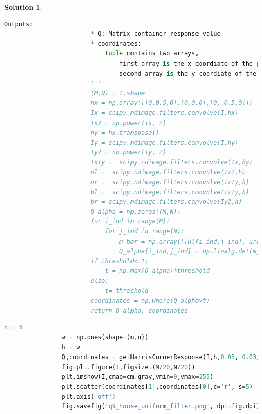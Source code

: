 \documentclass[11pt]{article}
\theoremstyle{plain}
\theoremstyle{definition}
\newtheorem{solution}{Solution}
\theoremstyle{remark}
\begin{document}
\begin{solution}
\begin{enumerate}
\begin{lstlisting}[language=Python, caption=Implementation of function $Q_a$]
					    Outputs:
					    * Q: Matrix container response value
					    * coordinates: 
					        tuple contains two arrays, 
					            first array is the x coordiate of the potins has corner response value larger than threshold
					            second array is the y coordiate of the potins has corner response value larger than threshold
					    '''
					    (M,N) = I.shape
					    hx = np.array([[0,0.5,0],[0,0,0],[0,-0.5,0]])
					    Ix = scipy.ndimage.filters.convolve(I,hx)
					    Ix2 = np.power(Ix, 2)
					    hy = hx.transpose()
					    Iy = scipy.ndimage.filters.convolve(I,hy)
					    Iy2 = np.power(Iy, 2)
					    IxIy =  scipy.ndimage.filters.convolve(Ix,hy)
					    ul =  scipy.ndimage.filters.convolve(Ix2,h)
					    ur =  scipy.ndimage.filters.convolve(IxIy,h)
					    bl =  scipy.ndimage.filters.convolve(IxIy,h)
					    br = scipy.ndimage.filters.convolve(Iy2,h)
					    Q_alpha = np.zeros((M,N))
					    for i_ind in range(M):
					        for j_ind in range(N):
					            m_bar = np.array([[ul[i_ind,j_ind], ur[i_ind,j_ind]],[bl[i_ind,j_ind],br[i_ind,j_ind]]])
					            Q_alpha[i_ind,j_ind] = np.linalg.det(m_bar) - alpha*(np.trace(m_bar))**2
					    if threshold<=1:
					        t = np.max(Q_alpha)*threshold
					    else:
					        t= threshold
					    coordinates = np.where(Q_alpha>t)
					    return Q_alpha, coordinates
			\end{lstlisting}
			
			\begin{lstlisting}[language=Python, caption=house with uniform filter]
				n = 3
				w = np.ones(shape=(n,n))
				h = w
				Q,coordinates = getHarrisCornerResponse(I,h,0.05, 0.03)
				fig=plt.figure(1,figsize=(M/20,N/20))
				plt.imshow(I,cmap=cm.gray,vmin=0,vmax=255)
				plt.scatter(coordinates[1],coordinates[0],c='r', s=5)
				plt.axis('off')
				fig.savefig('q9_house_uniform_filter.png', dpi=fig.dpi)
			\end{lstlisting}
			

\end{enumerate}
\end{solution}
\end{document}
